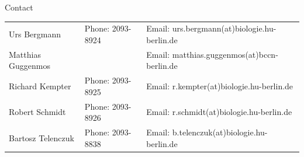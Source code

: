 \documentclass[12pt, a4]{article}
\begin{document}
\vfill
\centerline{\CAP Contact}
\CAP

\begin{tabular}{lll}
Urs Bergmann & Phone: 2093-8924 & Email:
urs.bergmann(at)biologie.hu-berlin.de \\
Matthias Guggenmos & & Email: matthias.guggenmos(at)bccn-berlin.de \\
Richard Kempter \hfill & Phone: 2093-8925 \hfill & Email:
r.kempter(at)biologie.hu-berlin.de \\
Robert Schmidt & Phone: 2093-8926 & Email: r.schmidt(at)biologie.hu-berlin.de
\\
Bartosz Telenczuk & Phone: 2093-8838 & Email:
b.telenczuk(at)biologie.hu-berlin.de \\
\end{tabular}
\end{document}
